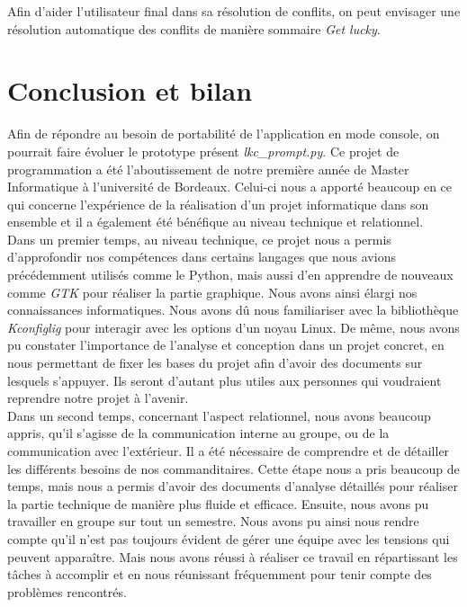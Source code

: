 \documentclass[17pts]{report}
\begin{document}
Afin d'aider l'utilisateur final dans sa résolution de conflits, on peut
envisager une résolution automatique des conflits de manière sommaire
\textit{Get lucky}.

\chapter{Conclusion et bilan}\thispagestyle{IHA-fancy-style}
\label{cha:Conclusion et bilan}
Afin de répondre au besoin de portabilité de l'application en mode console,
on pourrait faire évoluer le prototype présent \textit{lkc\_prompt.py}.
Ce projet de programmation a été l'aboutissement de notre première année de
Master Informatique à l'université de Bordeaux. Celui-ci nous a apporté
beaucoup en ce qui concerne l'expérience de la réalisation d'un projet
informatique dans son ensemble et il a également été bénéfique au niveau
technique et relationnel.\\

Dans un premier temps, au niveau technique, ce projet nous a permis
d'approfondir nos compétences dans certains langages que nous avions
précédemment utilisés comme le Python, mais aussi d'en apprendre de nouveaux
comme \textit{GTK} pour réaliser la partie graphique. Nous avons ainsi élargi
nos connaissances informatiques. Nous avons dû nous familiariser avec la
bibliothèque \textit{Kconfiglig} pour interagir avec les options d'un noyau
Linux. De même, nous avons pu constater l'importance de l'analyse et conception
dans un projet concret, en nous permettant de fixer les bases du projet afin
d'avoir des documents sur lesquels s'appuyer. Ils seront d'autant plus utiles
aux personnes qui voudraient reprendre notre projet à l'avenir.\\

Dans un second temps, concernant l'aspect relationnel, nous avons beaucoup
appris, qu'il s'agisse de la communication interne au groupe, ou de la
communication avec l'extérieur. Il a été nécessaire de comprendre et de
détailler les différents besoins de nos commanditaires. Cette étape nous a pris
beaucoup de temps, mais nous a permis d'avoir des documents d'analyse détaillés
pour réaliser la partie technique de manière plus fluide et efficace. Ensuite,
nous avons pu travailler en groupe sur tout un semestre. Nous avons pu ainsi
nous rendre compte qu'il n'est pas toujours évident de gérer une équipe avec
les tensions qui peuvent apparaître. Mais nous avons réussi à réaliser ce
travail en répartissant les tâches à accomplir et en nous réunissant
fréquemment pour tenir compte des problèmes rencontrés.\\
\end{document}
